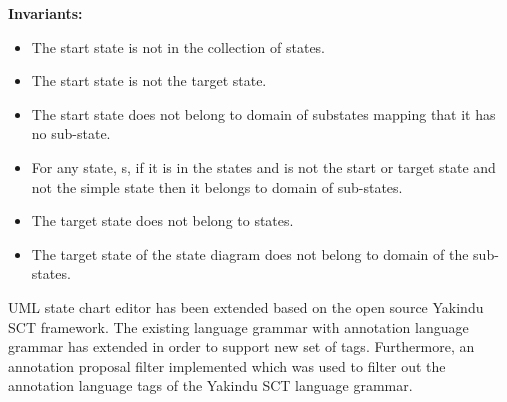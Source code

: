 \textbf{Invariants:}
\begin{itemize}
\item The start state is not in the collection of states.
\item The start state is not the target state.
\item The start state does not belong to domain of substates
mapping that it has no sub-state.
\item For any state, s, if it is in the states and is not the start or target state and not the simple state then it belongs to domain of sub-states.
\item The target state does not belong to states.
\item The target state of the state diagram does not belong to domain of the sub-states.
\end{itemize}

UML state chart editor has been extended based on the open source Yakindu SCT \cite{ref_15_yakindu:sct}framework. The existing language grammar with
annotation language grammar has extended in order to support new set
of tags. Furthermore, an annotation proposal filter implemented which was used to filter out the annotation language tags of the Yakindu SCT language grammar.

